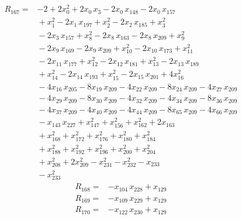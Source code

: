 \documentclass[11pt]{article}
\begin{document}
\begin{equation*}\begin{aligned}
R_{167}={}&-2 + 2x_{0}^{2} + 2x_{0}\,x_{3} - 2x_{0}\,x_{148} - 2x_{0}\,x_{157} \\
&{} + x_{1}^{2} - 2x_{1}\,x_{197} + x_{2}^{2} - 2x_{2}\,x_{185} + x_{3}^{2} \\
&{} - 2x_{3}\,x_{157} + x_{8}^{2} - 2x_{8}\,x_{163} - 2x_{8}\,x_{209} + x_{9}^{2} \\
&{} - 2x_{9}\,x_{169} - 2x_{9}\,x_{209} + x_{10}^{2} - 2x_{10}\,x_{173} + x_{11}^{2} \\
&{} - 2x_{11}\,x_{177} + x_{12}^{2} - 2x_{12}\,x_{181} + x_{13}^{2} - 2x_{13}\,x_{189} \\
&{} + x_{14}^{2} - 2x_{14}\,x_{193} + x_{15}^{2} - 2x_{15}\,x_{201} + 4x_{16}^{2} \\
&{} - 4x_{16}\,x_{205} - 8x_{19}\,x_{209} - 4x_{22}\,x_{209} - 8x_{24}\,x_{209} - 4x_{27}\,x_{209} \\
&{} - 4x_{29}\,x_{209} - 8x_{30}\,x_{209} - 4x_{32}\,x_{209} - 4x_{34}\,x_{209} - 8x_{36}\,x_{209} \\
&{} - 4x_{37}\,x_{209} - 4x_{40}\,x_{209} - 4x_{44}\,x_{209} - 8x_{65}\,x_{209} - 4x_{66}\,x_{209} \\
&{} - x_{143}\,x_{227} + x_{147}^{2} + x_{156}^{2} + x_{162}^{2} + 2x_{163} \\
&{} + x_{168}^{2} + x_{172}^{2} + x_{176}^{2} + x_{180}^{2} + x_{184}^{2} \\
&{} + x_{188}^{2} + x_{192}^{2} + x_{196}^{2} + x_{200}^{2} + x_{204}^{2} \\
&{} + x_{208}^{2} + 2x_{209}^{2} - x_{231}^{2} - x_{232}^{2} - x_{233} \\
&{} - x_{233}^{2}
\end{aligned}\end{equation*}
\begin{equation*}\begin{aligned}
R_{168}={}&-x_{104}\,x_{228} + x_{129}
\end{aligned}\end{equation*}
\begin{equation*}\begin{aligned}
R_{169}={}&-x_{109}\,x_{229} + x_{129}
\end{aligned}\end{equation*}
\begin{equation*}\begin{aligned}
R_{170}={}&-x_{122}\,x_{230} + x_{129}
\end{aligned}\end{equation*}
\end{document}
